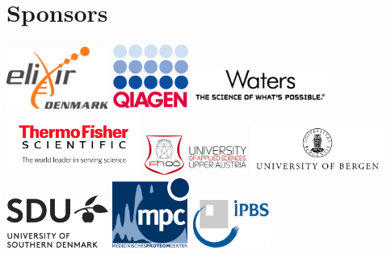 \documentclass[a5paper,11pt,oneside]{article}
\begin{document}
\section*{\color{eubicRed} Sponsors}
\begin{center}
  \includegraphics[width=0.25\textwidth]{graphics/ELIXIR.png}\hspace*{0.5cm}
  \includegraphics[width=0.19\textwidth]{graphics/qiagen.jpg}\hspace*{0.5cm}
  \includegraphics[width=0.33\textwidth]{graphics/waters.jpg}\\[0.3cm]
  \includegraphics[width=0.33\textwidth]{graphics/thermo.jpg}\hspace*{0.5cm}
  \includegraphics[width=0.25\textwidth]{graphics/FH.jpg}\hspace*{0.5cm}
  \includegraphics[width=0.33\textwidth]{graphics/UiBlogo_Eng_gray_m_V8.png}\\[0.3cm]
  \includegraphics[width=0.25\textwidth]{graphics/SDU_DK+UK_under.jpg}\hspace*{0.5cm}
  \includegraphics[width=0.19\textwidth]{graphics/mpc_logo_small.png}\hspace*{0.5cm}
  \includegraphics[width=0.19\textwidth]{graphics/ibps.png}
\end{center}
\end{document}
